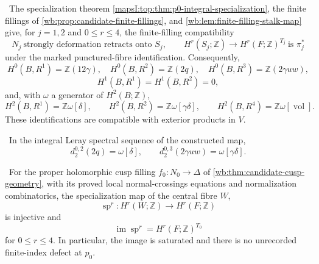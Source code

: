 
\begin{proposition}
\label{mapsI:top:prop:leray-e2}
\ The specialization theorem
\cref{mapsI:top:thm:p0-integral-specialization}, the finite fillings of
\cref{wb:prop:candidate-finite-fillings}, and
\cref{wb:lem:finite-filling-stalk-map} give, for \(j=1,2\) and
\(0\le r\le4\), the finite-filling compatibility
\[
\tag{IL.FF}
 N_j\ \text{strongly deformation retracts onto }S_j,\qquad
 H^r(S_j;\mathbb Z)\longrightarrow H^r(F;\mathbb Z)^{T_j}
 \ \text{is }\pi_j^*
\]
under the marked punctured-fibre identification.  Consequently,
\[
H^0(B,R^1)=\mathbb Z(12\gamma),\quad
H^0(B,R^2)=\mathbb Z(2q),\quad
H^0(B,R^3)=\mathbb Z(2\gamma uw),
\tag{IL.5.10}
\]
\[
 H^1(B,R^1)=H^1(B,R^2)=0,
\tag{IL.5.11}
\]
and, with \(\omega\) a generator of \(H^2(B;\mathbb Z)\),
\[
H^2(B,R^1)=\mathbb Z\omega[\delta],\qquad
H^2(B,R^2)=\mathbb Z\omega[\gamma\delta],\qquad
H^2(B,R^4)=\mathbb Z\omega[\operatorname{vol}].
\tag{IL.5.12}
\]
These identifications are compatible with exterior products in \(V\).
\end{proposition}

\begin{lemma}
\label{mapsI:top:lem:higher-transgressions}
\ In the integral Leray spectral sequence of the constructed map,
\[
 d_2^{0,2}(2q)=\omega[\delta],
 \qquad
 d_2^{0,3}(2\gamma uw)=\omega[\gamma\delta].
\tag{IL.5.22}
\]
\end{lemma}

\begin{theorem}
\label{mapsI:top:thm:p0-integral-specialization}
\ For the proper holomorphic cusp filling
\(f_0:N_0\to\Delta\) of \cref{wb:thm:candidate-cusp-geometry}, with its
proved local normal-crossings equations and normalization combinatorics,
the specialization map of the central fibre \(W\),
\[
 \operatorname{sp}^r:H^r(W;\mathbb Z)\longrightarrow H^r(F;\mathbb Z)
\]
is injective and
\[
 \operatorname{im}\operatorname{sp}^r
 =H^r(F;\mathbb Z)^{T_0}
\tag{IL.5.1}
\]
for \(0\le r\le4\).  In particular, the image is saturated and there is no
unrecorded finite-index defect at \(p_0\).
\end{theorem}

